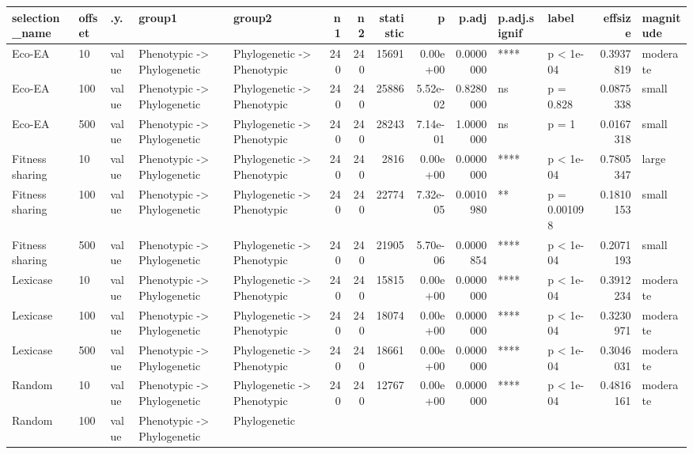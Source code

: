 \documentclass[]{book}
\begin{document}
\begin{table}
\centering
\begin{tabular}[t]{l|l|l|l|l|r|r|r|r|r|l|l|r|l}
\hline
selection\_name & offset & .y. & group1 & group2 & n1 & n2 & statistic & p & p.adj & p.adj.signif & label & effsize & magnitude\\
\hline
Eco-EA & 10 & value & Phenotypic
    ->
Phylogenetic & Phylogenetic
    ->
Phenotypic & 240 & 240 & 15691 & 0.00e+00 & 0.0000000 & **** & p < 1e-04 & 0.3937819 & moderate\\
\hline
Eco-EA & 100 & value & Phenotypic
    ->
Phylogenetic & Phylogenetic
    ->
Phenotypic & 240 & 240 & 25886 & 5.52e-02 & 0.8280000 & ns & p = 0.828 & 0.0875338 & small\\
\hline
Eco-EA & 500 & value & Phenotypic
    ->
Phylogenetic & Phylogenetic
    ->
Phenotypic & 240 & 240 & 28243 & 7.14e-01 & 1.0000000 & ns & p = 1 & 0.0167318 & small\\
\hline
Fitness sharing & 10 & value & Phenotypic
    ->
Phylogenetic & Phylogenetic
    ->
Phenotypic & 240 & 240 & 2816 & 0.00e+00 & 0.0000000 & **** & p < 1e-04 & 0.7805347 & large\\
\hline
Fitness sharing & 100 & value & Phenotypic
    ->
Phylogenetic & Phylogenetic
    ->
Phenotypic & 240 & 240 & 22774 & 7.32e-05 & 0.0010980 & ** & p = 0.001098 & 0.1810153 & small\\
\hline
Fitness sharing & 500 & value & Phenotypic
    ->
Phylogenetic & Phylogenetic
    ->
Phenotypic & 240 & 240 & 21905 & 5.70e-06 & 0.0000854 & **** & p < 1e-04 & 0.2071193 & small\\
\hline
Lexicase & 10 & value & Phenotypic
    ->
Phylogenetic & Phylogenetic
    ->
Phenotypic & 240 & 240 & 15815 & 0.00e+00 & 0.0000000 & **** & p < 1e-04 & 0.3912234 & moderate\\
\hline
Lexicase & 100 & value & Phenotypic
    ->
Phylogenetic & Phylogenetic
    ->
Phenotypic & 240 & 240 & 18074 & 0.00e+00 & 0.0000000 & **** & p < 1e-04 & 0.3230971 & moderate\\
\hline
Lexicase & 500 & value & Phenotypic
    ->
Phylogenetic & Phylogenetic
    ->
Phenotypic & 240 & 240 & 18661 & 0.00e+00 & 0.0000000 & **** & p < 1e-04 & 0.3046031 & moderate\\
\hline
Random & 10 & value & Phenotypic
    ->
Phylogenetic & Phylogenetic
    ->
Phenotypic & 240 & 240 & 12767 & 0.00e+00 & 0.0000000 & **** & p < 1e-04 & 0.4816161 & moderate\\
\hline
Random & 100 & value & Phenotypic
    ->
Phylogenetic & Phylogenetic

\end{tabular}
\end{table}
\end{document}
